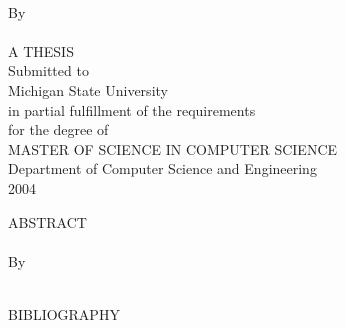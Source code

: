 \documentclass[12pt,letterpaper,oneside,openany]{book}
\renewcommand{\baselinestretch}{1.5}
\newcommand{\BIBNAME}{\centerline{BIBLIOGRAPHY}}
\newcommand{\thesistitle}{%
}
\newcommand{\thesisauthor}{%
}
\begin{document}
\frontmatter
\thispagestyle{empty}
  \vspace*{1in}
  \begin{center}
    \thesistitle{}\\
    By\\
    \thesisauthor{}\\
    \vspace*{2.5in}
    A THESIS\\[0.5\baselineskip]
    {\setlength{\baselineskip}{0.666667\baselineskip}
    Submitted to\\
    Michigan State University\\
    in partial fulfillment of the requirements\\
    for the degree of\\}
    MASTER OF SCIENCE IN COMPUTER SCIENCE\\
    Department of Computer Science and Engineering\\
    2004
  \end{center}
\newpage%
\thispagestyle{empty}
\begin{center}
ABSTRACT\\
\thesistitle{}\\
By\\
\thesisauthor{}\\[\baselineskip]
\end{center}
\clearpage
{\setlength{\parskip}{0.5\baselineskip}
\tableofcontents}
\clearpage
{\setlength{\parskip}{0.5\baselineskip}
\listoftables}
\clearpage
{\setlength{\parskip}{0.5\baselineskip}
\listoffigures}
\newpage%
\mainmatter
%
  





\appendix




\backmatter
{\renewcommand{\baselinestretch}{1.0}
 \setlength{\parskip}{1.5\baselineskip}
 \setlength{\baselineskip}{0.66\baselineskip}
\newpage
{}
\vspace*{4.4in}
\BIBNAME
}
\end{document}
